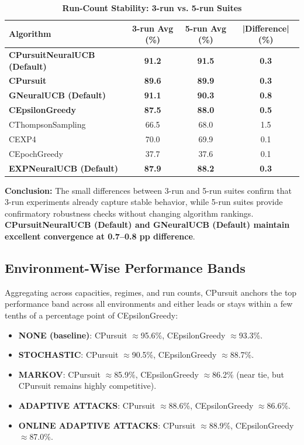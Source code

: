 \documentclass[12pt,a4paper]{article}
\newcommand{\success}[1]{\textcolor{successcolor}{\textbf{#1}}}
\newcommand{\legacy}[1]{\textcolor{legacycolor}{\textbf{#1}}}
\newcommand{\neural}[1]{\textcolor{neuralcolor}{\textbf{#1}}}
\begin{document}
\begin{table}[H]
\centering
\caption{\success{Run-Count Stability: 3-run vs. 5-run Suites}}
\begin{tabular}{|l|c|c|c|}
\hline
\textbf{Algorithm} & \textbf{3-run Avg (\%)} & \textbf{5-run Avg (\%)} & \textbf{|Difference| (\%)} \\
\hline
\hline
\neural{CPursuitNeuralUCB (Default)}  & \neural{91.2}     & \neural{91.5}     & \neural{0.3} \\
\success{CPursuit}                    & \success{89.6}     & \success{89.9}     & \success{0.3} \\
\neural{GNeuralUCB (Default)}         & \neural{91.1}     & \neural{90.3}     & \neural{0.8} \\
\success{CEpsilonGreedy}              & \success{87.5}     & \success{88.0}     & \success{0.5} \\
CThompsonSampling                     & 66.5              & 68.0              & 1.5 \\
CEXP4                                 & 70.0              & 69.9              & 0.1 \\
CEpochGreedy                          & 37.7              & 37.6              & 0.1 \\
\legacy{EXPNeuralUCB (Default)}       & \legacy{87.9}     & \legacy{88.2}     & \legacy{0.3} \\
\hline
\end{tabular}
\end{table}


\textbf{Conclusion:} The small differences between 3-run and 5-run suites confirm that 3-run experiments already capture stable behavior, while 5-run suites provide confirmatory robustness checks without changing algorithm rankings. \neural{CPursuitNeuralUCB (Default) and GNeuralUCB (Default) maintain excellent convergence at 0.7--0.8 pp difference}.

\subsection{Environment-Wise Performance Bands}

Aggregating across capacities, regimes, and run counts, CPursuit anchors the top performance band across all environments and either leads or stays within a few tenths of a percentage point of CEpsilonGreedy:

\begin{itemize}
\item \textbf{NONE (baseline)}: CPursuit $\approx$95.6\%, CEpsilonGreedy $\approx$93.3\%.
\item \textbf{STOCHASTIC}: CPursuit $\approx$90.5\%, CEpsilonGreedy $\approx$88.7\%.
\item \textbf{MARKOV}: CPursuit $\approx$85.9\%, CEpsilonGreedy $\approx$86.2\% (near tie, but CPursuit remains highly competitive).
\item \textbf{ADAPTIVE ATTACKS}: CPursuit $\approx$88.6\%, CEpsilonGreedy $\approx$86.6\%.
\item \textbf{ONLINE ADAPTIVE ATTACKS}: CPursuit $\approx$88.9\%, CEpsilonGreedy $\approx$87.0\%.
\end{itemize}
\end{document}
